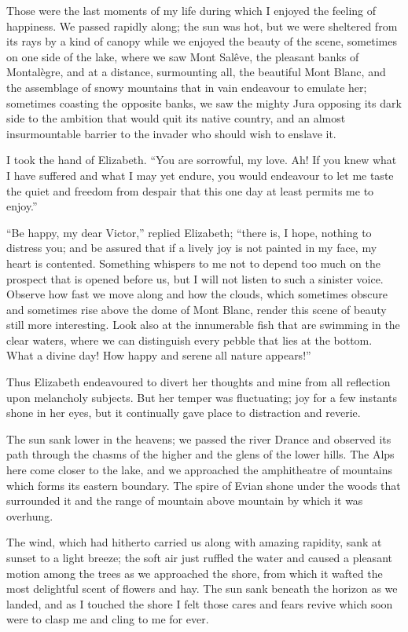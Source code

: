 \documentclass[12pt,openright]{book}
\begin{document}
Those were the last moments of my life during which I enjoyed the feeling of happiness. We passed rapidly along; the sun was hot, but we were sheltered from its rays by a kind of canopy while we enjoyed the beauty of the scene, sometimes on one side of the lake, where we saw Mont Salêve, the pleasant banks of Montalègre, and at a distance, surmounting all, the beautiful Mont Blanc, and the assemblage of snowy mountains that in vain endeavour to emulate her; sometimes coasting the opposite banks, we saw the mighty Jura opposing its dark side to the ambition that would quit its native country, and an almost insurmountable barrier to the invader who should wish to enslave it.

I took the hand of Elizabeth. “You are sorrowful, my love. Ah! If you knew what I have suffered and what I may yet endure, you would endeavour to let me taste the quiet and freedom from despair that this one day at least permits me to enjoy.”

“Be happy, my dear Victor,” replied Elizabeth; “there is, I hope, nothing to distress you; and be assured that if a lively joy is not painted in my face, my heart is contented. Something whispers to me not to depend too much on the prospect that is opened before us, but I will not listen to such a sinister voice. Observe how fast we move along and how the clouds, which sometimes obscure and sometimes rise above the dome of Mont Blanc, render this scene of beauty still more interesting. Look also at the innumerable fish that are swimming in the clear waters, where we can distinguish every pebble that lies at the bottom. What a divine day! How happy and serene all nature appears!”

Thus Elizabeth endeavoured to divert her thoughts and mine from all reflection upon melancholy subjects. But her temper was fluctuating; joy for a few instants shone in her eyes, but it continually gave place to distraction and reverie.

The sun sank lower in the heavens; we passed the river Drance and observed its path through the chasms of the higher and the glens of the lower hills. The Alps here come closer to the lake, and we approached the amphitheatre of mountains which forms its eastern boundary. The spire of Evian shone under the woods that surrounded it and the range of mountain above mountain by which it was overhung.

The wind, which had hitherto carried us along with amazing rapidity, sank at sunset to a light breeze; the soft air just ruffled the water and caused a pleasant motion among the trees as we approached the shore, from which it wafted the most delightful scent of flowers and hay. The sun sank beneath the horizon as we landed, and as I touched the shore I felt those cares and fears revive which soon were to clasp me and cling to me for ever.
\end{document}
